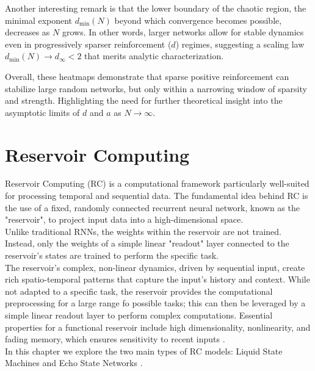 \documentclass[a4paper,12pt]{report}
\begin{document}
Another interesting remark is that the lower boundary of the 
chaotic region, the minimal exponent \(d_{\min}(N)\) beyond which 
convergence becomes possible, decreases as \(N\) grows. 
In other words, larger networks allow for stable dynamics even in 
progressively sparser reinforcement (\(d\)) regimes, suggesting a scaling 
law \(d_{\min}(N)\to d_\infty<2\) that merits analytic characterization.
\vspace{0.5em}

Overall, these heatmaps demonstrate that sparse positive reinforcement 
can stabilize large random networks, but only within a narrowing 
window of sparsity and strength. Highlighting the need for further 
theoretical insight into the asymptotic limits of \(d\) and \(a\) 
as \(N\to\infty\).  






\chapter{Reservoir Computing}
Reservoir Computing (RC) is a computational framework particularly well-suited for 
processing temporal and sequential data. The fundamental idea behind RC is the use of a 
fixed, randomly connected recurrent neural network, known as the "reservoir", to 
project input data into a high-dimensional space. \\
Unlike traditional RNNs, the weights within the reservoir are not trained. Instead, 
only the weights of a simple linear "readout" layer connected to the reservoir's states 
are trained to perform the specific task.\\
The reservoir's complex, non-linear dynamics, driven by sequential input, create rich 
spatio-temporal patterns that capture the input's history and context. While not adapted 
to a specific task, the reservoir provides the computational preprocessing for a large
range fo possible tasks; this can then be leveraged by a simple linear readout layer to 
perform complex computations. 
Essential properties for a functional reservoir include high dimensionality, nonlinearity, 
and fading memory, which ensures sensitivity to recent inputs \cite{TANAKA2019100}.\\
In this chapter we explore the two main types of RC models: Liquid State Machines
\cite{Maass2002} and Echo State Networks \cite{Jaeger2001}.
\end{document}
